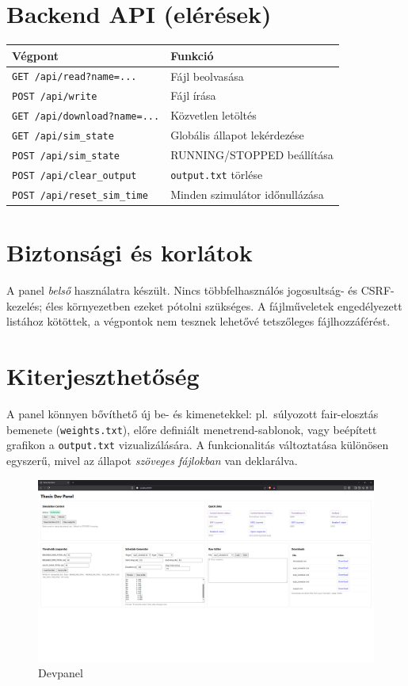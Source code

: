 \section{Backend API (elérések)}
\begin{center}
\begin{tabular}{ll}
\hline
\textbf{Végpont} & \textbf{Funkció} \\
\hline
\texttt{GET\ /api/read?name=...} & Fájl beolvasása \\
\texttt{POST\ /api/write} & Fájl írása \\
\texttt{GET\ /api/download?name=...} & Közvetlen letöltés \\
\texttt{GET\ /api/sim\_state} & Globális állapot lekérdezése \\
\texttt{POST\ /api/sim\_state} & RUNNING/STOPPED beállítása \\
\texttt{POST\ /api/clear\_output} & \texttt{output.txt} törlése \\
\texttt{POST\ /api/reset\_sim\_time} & Minden szimulátor időnullázása \\
\hline
\end{tabular}
\end{center}

\section{Biztonsági és korlátok}
A panel \emph{belső} használatra készült. Nincs többfelhasználós jogosultság- és CSRF-kezelés; 
éles környezetben ezeket pótolni szükséges. A fájlműveletek engedélyezett listához kötöttek, 
a végpontok nem tesznek lehetővé tetszőleges fájlhozzáférést.

\section{Kiterjeszthetőség}
A panel könnyen bővíthető új be- és kimenetekkel: pl.\ súlyozott fair-elosztás bemenete (\texttt{weights.txt}), 
előre definiált menetrend-sablonok, vagy beépített grafikon a \texttt{output.txt} vizualizálására. 
A funkcionalitás változtatása különösen egyszerű, mivel az állapot \emph{szöveges fájlokban} 
van deklarálva.

\begin{figure}[H]
    \centering
    \includegraphics[width=1\textwidth]{figures/devpanel.png}
    \caption{Devpanel}
    \label{fig:devpanel}
\end{figure}

